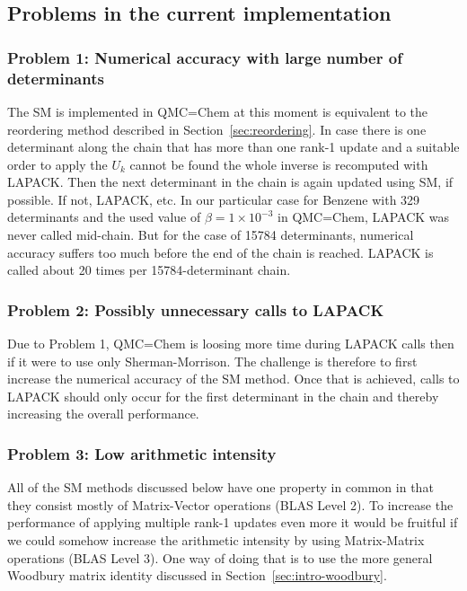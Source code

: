\documentclass[11pt]{article}
\numberwithin{figure}{section}
\numberwithin{table}{section}
\begin{document}
    \subsection{Problems in the current implementation}	
			
    \subsubsection{Problem 1: Numerical accuracy with large number of determinants}
      The SM is implemented in QMC=Chem at this moment is equivalent to the reordering method described in Section~\ref{sec:reordering}. In case there is one determinant along the chain that has more than one rank-1 update and a suitable order to apply the $U_k$ cannot be found the whole inverse is recomputed with LAPACK. Then the next determinant in the chain is again updated using SM, if possible. If not, LAPACK, etc. In our particular case for Benzene with 329 determinants and the used value of $\beta=1\times 10^{-3}$ in QMC=Chem, LAPACK was never called mid-chain. But for the case of 15784 determinants, numerical accuracy suffers too much before the end of the chain is reached. LAPACK is called about 20 times per 15784-determinant chain.
    
    \subsubsection{Problem 2: Possibly unnecessary calls to LAPACK}
      Due to Problem 1, QMC=Chem is loosing more time during LAPACK calls then if it were to use only Sherman-Morrison. The challenge is therefore to first increase the numerical accuracy of the SM method. Once that is achieved, calls to LAPACK should only occur for the first determinant in the chain and thereby increasing the overall performance.
    
    \subsubsection{Problem 3: Low arithmetic intensity}
      All of the SM methods discussed below have one property in common in that they consist mostly of Matrix-Vector operations (BLAS Level 2). To increase the performance of applying multiple rank-1 updates even more it would be fruitful if we could somehow increase the arithmetic intensity by using Matrix-Matrix operations (BLAS Level 3). One way of doing that is to use the more general Woodbury matrix identity discussed in Section~\ref{sec:intro-woodbury}.
				
\end{document}

